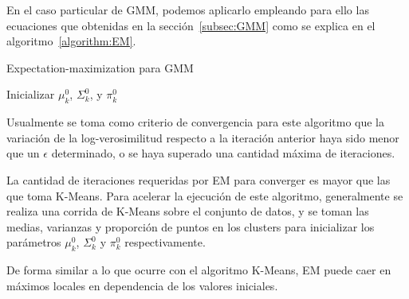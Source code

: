 En el caso particular de GMM, podemos aplicarlo empleando para ello las ecuaciones que obtenidas en la sección~\ref{subsec:GMM} como se explica en el algoritmo~\ref{algorithm:EM}.

\begin{algorithm}
    \caption{Expectation-maximization para GMM}
    \label{algorithm:EM}
    Inicializar $\mu_k^0$, $\Sigma_k^0$, y $\pi_k^0$\;
\end{algorithm}

Usualmente se toma como criterio de convergencia para este algoritmo que la variación de la log-verosimilitud respecto a la iteración anterior haya sido menor que un $\epsilon$ determinado, o se haya superado una cantidad máxima de iteraciones.

La cantidad de iteraciones requeridas por EM para converger es mayor que las que toma K-Means. %
Para acelerar la ejecución de este algoritmo, generalmente se realiza una corrida de K-Means sobre el conjunto de datos, y se toman las medias, varianzas y proporción de puntos en los clusters para inicializar los parámetros $\mu_k^0$, $\Sigma_k^0$ y $\pi_k^0$ respectivamente.

De forma similar a lo que ocurre con el algoritmo K-Means, EM puede caer en máximos locales en dependencia de los valores iniciales.



